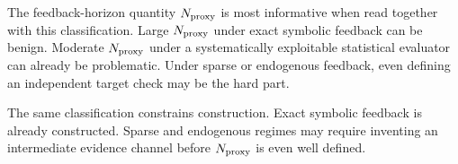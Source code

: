 The feedback-horizon quantity \(N_{\mathrm{proxy}}\) is most informative when read together with this
classification.  Large \(N_{\mathrm{proxy}}\) under exact symbolic feedback can be benign.  Moderate
\(N_{\mathrm{proxy}}\) under a systematically exploitable statistical evaluator can already be
problematic.  Under sparse or endogenous feedback, even defining an independent
target check may be the hard part.

The same classification constrains construction.  Exact symbolic feedback is already
constructed.  Sparse and endogenous regimes may require inventing an intermediate
evidence channel before \(N_{\mathrm{proxy}}\) is even well defined.

